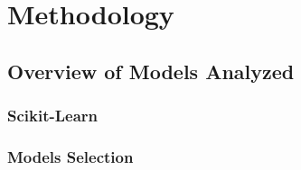 %
%
\chapter{Methodology}
\hypersetup{colorlinks=true, linkcolor=red}
    \section{Overview of Models Analyzed}
        \subsection{Scikit-Learn}  
        \subsection{Models Selection}

